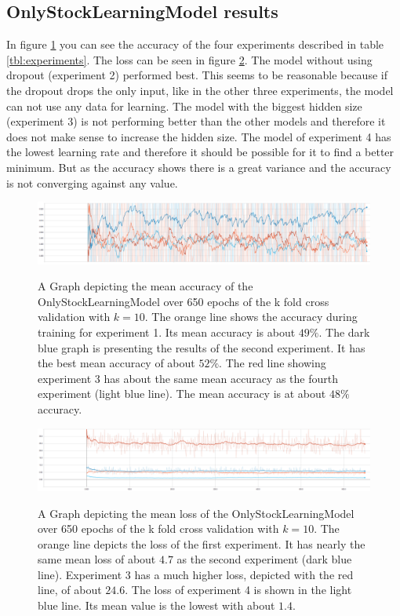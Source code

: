 \subsection{OnlyStockLearningModel results}
\label{subsec:onlystockmodelexperiment}
In figure \ref{fig:OSLM_k-accuracy} you can see the accuracy of the four experiments described in table \ref{tbl:experiments}. The loss can be seen in figure \ref{fig:OSLM_k-loss}. The model without using dropout (experiment 2) performed best. This seems to be reasonable because if the dropout drops the only input, like in the other three experiments, the model can not use any data for learning. The model with the biggest hidden size (experiment 3) is not performing better than the other models and therefore it does not make sense to increase the hidden size. The model of experiment 4 has the lowest learning rate and therefore it should be possible for it to find a better minimum. But as the accuracy shows there is a great variance and the accuracy is not converging against any value.\\
\begin{figure}[tb]
	\caption{A Graph depicting the mean accuracy of the OnlyStockLearningModel over 650 epochs of the k fold cross validation with $k=10$. The orange line shows the accuracy during training for experiment 1. Its mean accuracy is about $49\%$. The dark blue graph is presenting the results of the second experiment. It has the best mean accuracy of about $52\%$. The red line showing experiment 3 has about the same mean accuracy as the fourth experiment (light blue line). The mean accuracy is at about $48\%$ accuracy.}
	\includegraphics[width=0.95\linewidth]{images/OSLM_k-accuracy.PNG}
	\label{fig:OSLM_k-accuracy}
\end{figure}
\begin{figure}[tb]
	\caption{A Graph depicting the mean loss of the OnlyStockLearningModel over 650 epochs of the k fold cross validation with $k=10$. The orange line depicts the loss of the first experiment. It has nearly the same mean loss of about $4.7$ as the second experiment (dark blue line). Experiment 3 has a much higher loss, depicted with the red line, of about $24.6$. The loss of experiment 4 is shown in the light blue line. Its mean value is the lowest with about $1.4$.}
	\includegraphics[width=0.95\linewidth]{images/OSLM_k-loss.PNG}
	\label{fig:OSLM_k-loss}
\end{figure}
